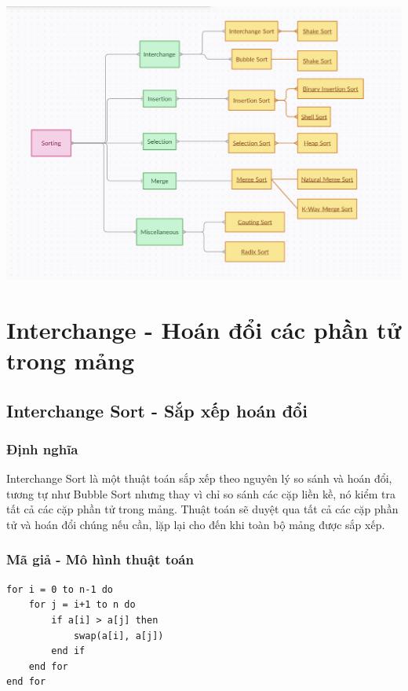 \documentclass[12pt,a4paper]{report}
\begin{document}
\vspace*{1cm}
{ \includegraphics[width=16cm]{sort.png}}\\[0.5cm]

\large 

\chapter{ Interchange - Hoán đổi các phần tử  trong mảng}

\section{ Interchange Sort - Sắp xếp hoán đổi}
 
\subsection{ Định nghĩa}

{\large \hspace{1cm} Interchange Sort là một thuật toán sắp xếp theo nguyên lý so sánh và hoán đổi, tương tự như Bubble Sort nhưng thay vì chỉ so sánh các cặp liền kề, nó kiểm tra tất cả các cặp phần tử trong mảng. Thuật toán sẽ duyệt qua tất cả các cặp phần tử và hoán đổi chúng nếu cần, lặp lại cho đến khi toàn bộ mảng được sắp xếp.}

\subsection{ Mã giả - Mô hình thuật toán}

\begin{lstlisting}
for i = 0 to n-1 do
    for j = i+1 to n do
        if a[i] > a[j] then
            swap(a[i], a[j])
        end if
    end for
end for
\end{lstlisting}
\end{document}
